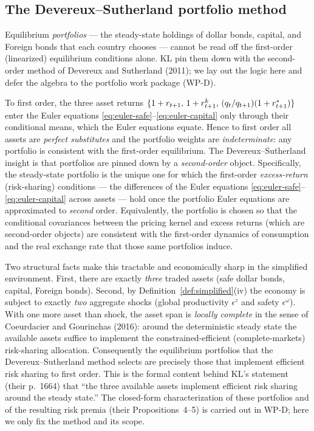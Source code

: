 \subsection{The Devereux--Sutherland portfolio method}
\label{sec:ds-method}

Equilibrium \emph{portfolios} --- the steady-state holdings of dollar bonds,
capital, and Foreign bonds that each country chooses --- cannot be read off the
first-order (linearized) equilibrium conditions alone. KL pin them down with the
second-order method of Devereux and Sutherland (2011); we lay out the logic here
and defer the algebra to the portfolio work package (WP-D).

To first order, the three asset returns
$\{1+r_{t+1},\,1+r^{k}_{t+1},\,(q_t/q_{t+1})(1+r^{*}_{t+1})\}$ enter the
Euler equations \eqref{eq:euler-safe}--\eqref{eq:euler-capital} only through
their conditional means, which the Euler equations equate. Hence to first order
all assets are \emph{perfect substitutes} and the portfolio weights are
\emph{indeterminate}: any portfolio is consistent with the first-order
equilibrium. The Devereux--Sutherland insight is that portfolios are pinned down
by a \emph{second-order} object. Specifically, the steady-state portfolio is the
unique one for which the first-order \emph{excess-return} (risk-sharing)
conditions --- the differences of the Euler equations
\eqref{eq:euler-safe}--\eqref{eq:euler-capital} across assets --- hold once the
portfolio Euler equations are approximated to \emph{second} order. Equivalently,
the portfolio is chosen so that the conditional covariances between the pricing
kernel and excess returns (which are second-order objects) are consistent with
the first-order dynamics of consumption and the real exchange rate that those
same portfolios induce.

Two structural facts make this tractable and economically sharp in the simplified
environment. First, there are exactly \emph{three} traded assets (safe dollar
bonds, capital, Foreign bonds). Second, by Definition~\ref{def:simplified}(iv)
the economy is subject to exactly \emph{two} aggregate shocks (global
productivity $\epsilon^z$ and safety $\epsilon^\omega$). With one more asset than
shock, the asset span is \emph{locally complete} in the sense of Coeurdacier and
Gourinchas (2016): around the deterministic steady state the available assets
suffice to implement the constrained-efficient (complete-markets) risk-sharing
allocation. Consequently the equilibrium portfolios that the
Devereux--Sutherland method selects are precisely those that implement efficient
risk sharing to first order. This is the formal content behind KL's statement
(their p.~1664) that ``the three available assets implement efficient risk
sharing around the steady state.'' The closed-form characterization of these
portfolios and of the resulting risk premia (their Propositions~4--5) is carried
out in WP-D; here we only fix the method and its scope.

